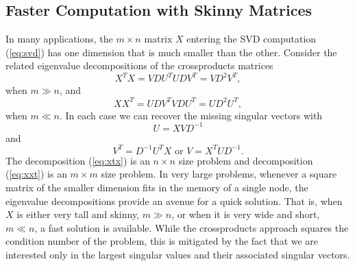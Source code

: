 \subsection{Faster Computation with Skinny Matrices}
In many applications, the $m\times n$ matrix $X$ entering the
SVD computation (\ref{eq:svd}) has one dimension that is
much smaller than the other. Consider the related eigenvalue
decompositions of the crossproducts matrices
\begin{equation}
  X^TX = V D U^T U D V^T = V D^2 V^T,
  \label{eq:xtx}
\end{equation}
when $m \gg n$,
and
\begin{equation}
  XX^T = U D V^T V D U^T = U D^2 U^T,
  \label{eq:xxt}
\end{equation}
when $m \ll n$.
In each case we can recover the missing singular vectors with
\begin{displaymath}
  U = XVD^{-1}
\end{displaymath}
and
\begin{equation}
  V^T = D^{-1}U^TX \mbox{ or } V = X^TUD^{-1}.
  \label{eq:vtorv}
\end{equation}
The decomposition (\ref{eq:xtx}) is an $n\times n$ size problem and
decomposition (\ref{eq:xxt}) is an $m\times m$ size problem. In very
large problems, whenever a square matrix of the smaller dimension fits
in the memory of a single node, the eigenvalue decompositions provide
an avenue for a quick solution. That is, when $X$ is either very tall
and skinny, $m \gg n$, or when it is very wide and short, $m \ll n$, a
fast solution is available. While the crossproducts approach squares
the condition number of the problem, this is mitigated by the fact
that we are interested only in the largest singular values and their
associated singular vectors.

